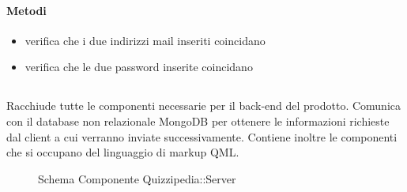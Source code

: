 \paragraph{Metodi}
\begin{itemize}
\item {}
\newline
verifica che i due indirizzi mail inseriti coincidano
\newline
\item {}
\newline
verifica che le due password inserite coincidano
\newline
\end{itemize}
\subsection{}
Racchiude tutte le componenti necessarie per il back-end del prodotto. Comunica con il database non relazionale MongoDB per ottenere le informazioni richieste dal client a cui verranno inviate successivamente.
Contiene inoltre le componenti che si occupano del linguaggio di markup QML.
\begin{figure}[H]
\centering
\noindent{}
\caption[Schema Componente Server]{Schema Componente Quizzipedia::Server}
\end{figure}
